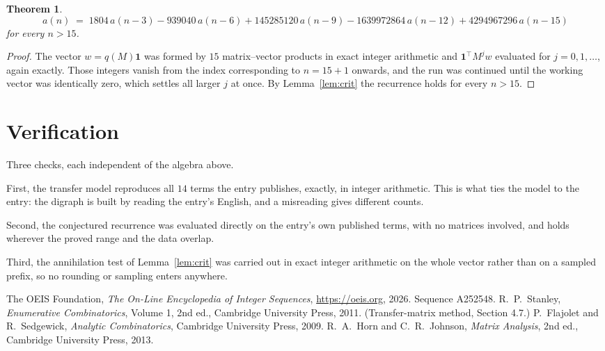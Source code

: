 \documentclass[11pt,a4paper]{article}
\theoremstyle{plain}
\newtheorem{theorem}{Theorem}
\theoremstyle{definition}
\begin{document}
\begin{theorem}
\[
a(n)\;=\;1804\,a(n-3) - 939040\,a(n-6) + 145285120\,a(n-9) - 1639972864\,a(n-12) + 4294967296\,a(n-15)
\]
for every $n>15$.
\end{theorem}

\begin{proof}
The vector $w=q(M)\mathbf{1}$ was formed by $15$ matrix--vector products in exact
integer arithmetic and $\mathbf{1}^{\!\top}M^{j}w$ evaluated for $j=0,1,\dots$, again
exactly. Those integers vanish from the index corresponding to $n=15+1$ onwards, and the
run was continued until the working vector was identically zero, which settles all larger $j$
at once. By Lemma~\ref{lem:crit} the recurrence holds for every $n>15$.
\end{proof}

\section{Verification}

Three checks, each independent of the algebra above.

First, the transfer model reproduces all $14$ terms the entry publishes, exactly, in
integer arithmetic. This is what ties the model to the entry: the digraph is built by reading
the entry's English, and a misreading gives different counts.

Second, the conjectured recurrence was evaluated directly on the entry's own published terms,
with no matrices involved, and holds wherever the proved range and the data overlap.

Third, the annihilation test of Lemma~\ref{lem:crit} was carried out in exact integer
arithmetic on the whole vector rather than on a sampled prefix, so no rounding or sampling
enters anywhere.

\begin{thebibliography}{9}
 The OEIS Foundation, \emph{The On-Line Encyclopedia of Integer
Sequences}, \url{https://oeis.org}, 2026. Sequence A252548.
 R.~P.~Stanley, \emph{Enumerative Combinatorics}, Volume 1, 2nd ed.,
Cambridge University Press, 2011. (Transfer-matrix method, Section 4.7.)
 P.~Flajolet and R.~Sedgewick, \emph{Analytic Combinatorics}, Cambridge
University Press, 2009.
 R.~A.~Horn and C.~R.~Johnson, \emph{Matrix Analysis}, 2nd ed., Cambridge
University Press, 2013.
\end{thebibliography}
\end{document}
